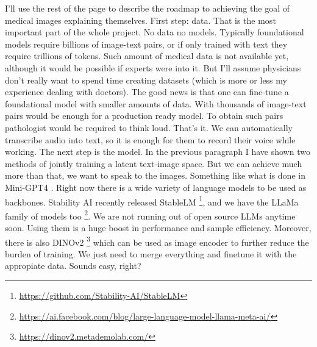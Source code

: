 I'll use the rest of the page to describe the roadmap to achieving the goal of medical images explaining themselves. First step: data. That is the most important part of the whole project. No data no models. Typically foundational models require billions of image-text pairs, or if only trained with text they require trillions of tokens. Such amount of medical data is not available yet, although it would be possible if experts were into it. But I'll assume physicians don't really want to spend time creating datasets (which is more or less my experience dealing with doctors). The good news is that one can fine-tune a foundational model with smaller amounts of data. With thousands of image-text pairs would be enough for a production ready model. To obtain such pairs pathologist would be required to think loud. That's it. We can automatically transcribe audio into text, so it is enough for them to record their voice while working. The next step is the model. In the previous paragraph I have shown two methods of jointly training a latent text-image space. But we can achieve much more than that, we want to speak to the images. Something like what is done in Mini-GPT4 \cite{zhu2023minigpt4}. Right now there is a wide variety of language models to be used as backbones. Stability AI recently released StableLM \footnote{\url{https://github.com/Stability-AI/StableLM}}, and we have the LLaMa family of models too \footnote{\url{https://ai.facebook.com/blog/large-language-model-llama-meta-ai/}}. We are not running out of open source LLMs anytime soon. Using them is a huge boost in performance and sample efficiency. Moreover, there is also DINOv2 \footnote{\url{https://dinov2.metademolab.com/}} which can be used as image encoder to further reduce the burden of training. We just need to merge everything and finetune it with the appropiate data. Sounds easy, right?